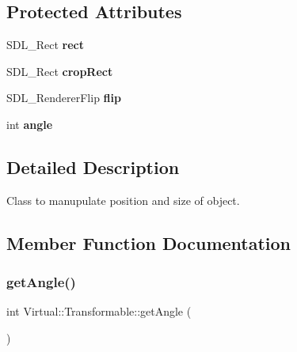 \subsection*{Protected Attributes}
\begin{DoxyCompactItemize}
\item 
\hypertarget{class_virtual_1_1_transformable_af218a7ebdc91c7714b791a5973c3ff43}{}\label{class_virtual_1_1_transformable_af218a7ebdc91c7714b791a5973c3ff43} 
S\+D\+L\+\_\+\+Rect {\bfseries rect}
\item 
\hypertarget{class_virtual_1_1_transformable_a38b781918dcf60c7154f0a288c5bb434}{}\label{class_virtual_1_1_transformable_a38b781918dcf60c7154f0a288c5bb434} 
S\+D\+L\+\_\+\+Rect {\bfseries crop\+Rect}
\item 
\hypertarget{class_virtual_1_1_transformable_aca6c8a4c255cc8dc72bf831cbeb918bb}{}\label{class_virtual_1_1_transformable_aca6c8a4c255cc8dc72bf831cbeb918bb} 
S\+D\+L\+\_\+\+Renderer\+Flip {\bfseries flip}
\item 
\hypertarget{class_virtual_1_1_transformable_a6ce7c408bf4fc4b21147dce206a7bb29}{}\label{class_virtual_1_1_transformable_a6ce7c408bf4fc4b21147dce206a7bb29} 
int {\bfseries angle}
\end{DoxyCompactItemize}


\subsection{Detailed Description}
Class to manupulate position and size of object. 

\subsection{Member Function Documentation}
\hypertarget{class_virtual_1_1_transformable_acda950f2b5d3f2b85aec5663bec79611}{}\label{class_virtual_1_1_transformable_acda950f2b5d3f2b85aec5663bec79611} 
\subsubsection{\texorpdfstring{get\+Angle()}{getAngle()}}
{\footnotesize\ttfamily int Virtual\+::\+Transformable\+::get\+Angle (\begin{DoxyParamCaption}{ }\end{DoxyParamCaption})}

